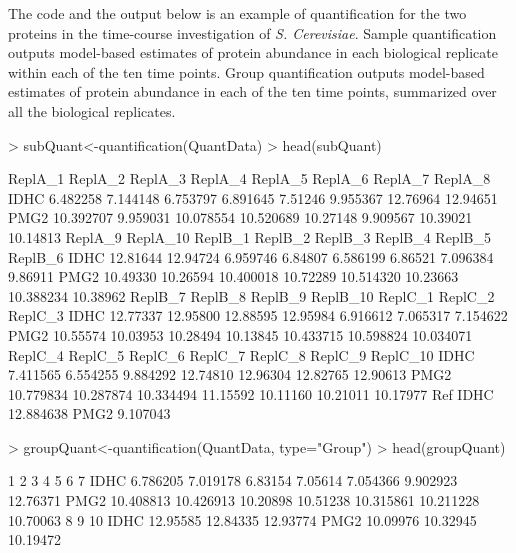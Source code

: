 \documentclass[11pt]{article}
\begin{document}
The code and the output  below is an example of quantification for the two proteins in the  time-course investigation of {\it S. Cerevisiae}. Sample quantification outputs model-based estimates of protein abundance in each biological replicate within each of the ten time points. Group quantification outputs model-based estimates of protein abundance in each of the ten time points, summarized over all the biological replicates.

\begin{small}
\begin{Schunk}
\begin{Sinput}
> subQuant<-quantification(QuantData)
> head(subQuant)
\end{Sinput}
\begin{Soutput}
       ReplA_1  ReplA_2   ReplA_3   ReplA_4  ReplA_5  ReplA_6  ReplA_7  ReplA_8
IDHC  6.482258 7.144148  6.753797  6.891645  7.51246 9.955367 12.76964 12.94651
PMG2 10.392707 9.959031 10.078554 10.520689 10.27148 9.909567 10.39021 10.14813
      ReplA_9 ReplA_10   ReplB_1  ReplB_2   ReplB_3  ReplB_4   ReplB_5  ReplB_6
IDHC 12.81644 12.94724  6.959746  6.84807  6.586199  6.86521  7.096384  9.86911
PMG2 10.49330 10.26594 10.400018 10.72289 10.514320 10.23663 10.388234 10.38962
      ReplB_7  ReplB_8  ReplB_9 ReplB_10   ReplC_1   ReplC_2   ReplC_3
IDHC 12.77337 12.95800 12.88595 12.95984  6.916612  7.065317  7.154622
PMG2 10.55574 10.03953 10.28494 10.13845 10.433715 10.598824 10.034071
       ReplC_4   ReplC_5   ReplC_6  ReplC_7  ReplC_8  ReplC_9 ReplC_10
IDHC  7.411565  6.554255  9.884292 12.74810 12.96304 12.82765 12.90613
PMG2 10.779834 10.287874 10.334494 11.15592 10.11160 10.21011 10.17977
           Ref
IDHC 12.884638
PMG2  9.107043
\end{Soutput}
\end{Schunk}

\begin{Schunk}
\begin{Sinput}
> groupQuant<-quantification(QuantData, type="Group")
> head(groupQuant)
\end{Sinput}
\begin{Soutput}
             1         2        3        4         5         6        7
IDHC  6.786205  7.019178  6.83154  7.05614  7.054366  9.902923 12.76371
PMG2 10.408813 10.426913 10.20898 10.51238 10.315861 10.211228 10.70063
            8        9       10
IDHC 12.95585 12.84335 12.93774
PMG2 10.09976 10.32945 10.19472
\end{Soutput}
\end{Schunk}
\end{small}
\end{document}
